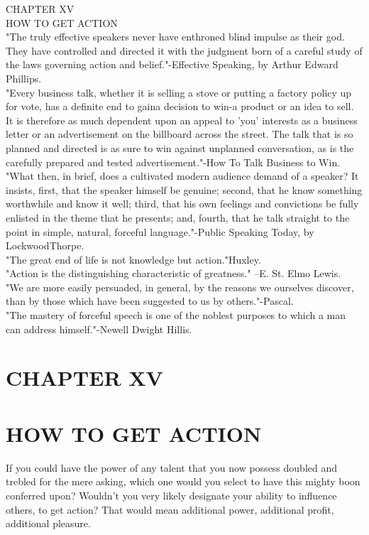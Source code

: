 \documentclass[10pt]{article}
\begin{document}
CHAPTER XV\\
HOW TO GET ACTION\\
"The truly effective speakers never have enthroned blind impulse as their god. They have controlled and directed it with the judgment born of a careful study of the laws governing action and belief."-Effective Speaking, by Arthur Edward Phillips.\\
"Every business talk, whether it is selling a stove or putting a factory policy up for vote, has a definite end to gaina decision to win-a product or an idea to sell. It is therefore as much dependent upon an appeal to 'you' interests as a business letter or an advertisement on the billboard across the street. The talk that is so planned and directed is as sure to win against unplanned conversation, as is the carefully prepared and tested advertisement."-How To Talk Business to Win.\\
"What then, in brief, does a cultivated modern audience demand of a speaker? It insists, first, that the speaker himself be genuine; second, that he know something worthwhile and know it well; third, that his own feelings and convictions be fully enlisted in the theme that he presents; and, fourth, that he talk straight to the point in simple, natural, forceful language."-Public Speaking Today, by LockwoodThorpe.\\
"The great end of life is not knowledge but action."Huxley.\\
"Action is the distinguishing characteristic of greatness." --E. St. Elmo Lewis.\\
"We are more easily persuaded, in general, by the reasons we ourselves discover, than by those which have been suggested to us by others."-Pascal.\\
"The mastery of forceful speech is one of the noblest purposes to which a man can address himself."-Newell Dwight Hillis.

\section*{CHAPTER XV}
\section*{HOW TO GET ACTION}
If you could have the power of any talent that you now possess doubled and trebled for the mere asking, which one would you select to have this mighty boon conferred upon? Wouldn't you very likely designate your ability to influence others, to get action? That would mean additional power, additional profit, additional pleasure.
\end{document}
